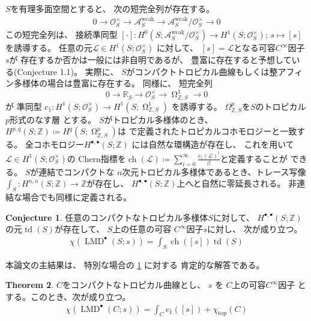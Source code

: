 \documentclass[uplatex,dvipdfmx,12pt]{jsarticle}
\numberwithin{equation}{section}
\theoremstyle{definition}
\newtheorem{theorem}{Theorem}[section]
\newtheorem{conjecture}[theorem]{Conjecture}
\newcommand{\deq}{\coloneqq}
\newcommand{\opn}[1]{\operatorname{#1}}
\DeclareMathOperator{\tform}{\Omega}
\begin{document}
$S$を有理多面空間とすると、
次の短完全列が存在する。
\begin{align}
0\to \mathcal{O}_S^{\times} \to 
\mathcal{A}^{\mathrm{weak}}_S \to 
\mathcal{A}^{\mathrm{weak}}_S/\mathcal{O}_S^{\times}
\to 0
\end{align}
この短完全列は、
接続準同型
$
[\cdot] \colon 
H^{0}(S;\mathcal{A}^{\mathrm{weak}}_S/\mathcal{O}_S^{\times})
\to H^{1}(S;\mathcal{O}_S^{\times})
$;
$
s\mapsto [s]
$
を誘導する。
任意の元$\mathcal{L}\in H^{1}(S;\mathcal{O}^{\times}_S)$
に対して、
$[s]=\mathcal{L}$となる可容$C^{\infty}$因子
$s$が
存在するか否かは一般には非自明であるが、
豊富に存在すると予想している(Conjecture 1.1)。
実際に、
$S$がコンパクトトロピカル曲線もしくは整アフィン多様体の場合は豊富に存在する。
同様に、
短完全列
\begin{equation}
0
\to \mathbb{R}_S
\to \mathcal{O}^{\times}_S
\to \tform_{\mathbb{Z},S}^{1}
\to 0
\end{equation}
が
準同型
$
c_1\colon H^{1}(S;\mathcal{O}^{\times}_S)
\to H^{1}(S;\tform_{\mathbb{Z},S}^{1})
$
を誘導する。
$\Omega_{\mathbb{Z},S}^{p}$を$S$のトロピカル$p$形式のなす層
とする\cite{gross2019sheaftheoretic}。
$S$がトロピカル多様体のとき、
$H^{p,q}(S;\mathbb{Z})\deq H^{q}(S;\tform_{\mathbb{Z},S}^{p})$は
\cite{mikhalkinTropicalEigenwaveIntermediate2014a}
で定義されたトロピカルコホモロジーと一致する。
全コホモロジー$H^{\bullet,\bullet}(S;\mathbb{Z})$
には自然な環構造が存在し、
これを用いて
$\mathcal{L}\in H^{1}(S;\mathcal{O}_S^{\times})$の
Chern指標を$\opn{ch}(\mathcal{L})\deq
\sum_{i=0}^{\infty}\frac{c_1(\mathcal{L})^{i}}{i!}$と定義することが
できる。
$S$が連結でコンパクトな
$n$次元トロピカル多様体であるとき、トレース写像
$\int_{S}\colon H^{n,n}(S;\mathbb{Z})\to \mathbb{Z}$が存在し、
$H^{\bullet,\bullet}(S;\mathbb{Z})$上へと自然に零延長される。
非連結な場合でも同様に定義される。
\setcounter{section}{1}
\setcounter{condition}{1}
\begin{conjecture} \label{conjecture-mirror-tropical-rr}
任意のコンパクトなトロピカル多様体$S$に対して、
$H^{\bullet,\bullet}(S;\mathbb{Z})$
の元$\opn{td}(S)$が存在して、
$S$上の任意の可容
$C^{\infty}$因子$s$に対し、
次が成り立つ。
\begin{align}
\chi(\opn{LMD}^{\bullet}(S;s))=
\int_{S}\opn{ch}([s])\opn{td}(S)
\end{align}
\end{conjecture}


本論文の主結果は、
特別な場合の
\cref{conjecture-mirror-tropical-rr}
に対する
肯定的な解答である。

\begin{theorem} \label{theorem-main-1}
$C$をコンパクトなトロピカル曲線とし、
$s$ を $C$上の可容$C^{\infty}$因子 
とする。このとき、次が成り立つ。
\begin{align}
\chi(\opn{LMD}^{\bullet}(C;s))=\int_C c_1([s])+
\chi_{\opn{top}}(C)
\end{align}
\end{theorem}
\end{document}
